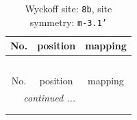 \documentclass[fleqn,8pt]{jsarticle}
\begin{document}
\renewcommand{\arraystretch}{1.2}
\begin{longtable}{ccc}
\caption{Wyckoff site: {\tt 8b}, site symmetry: {\tt m-3.1'}}
 \\
 \hline \hline
No. & position & mapping \\ \hline \endfirsthead

\multicolumn{2}{l}{\tablename\ \thetable{}} \\
 \hline \hline
No. & position & mapping \\ \hline \endhead

 \hline \hline
\multicolumn{2}{r}{\footnotesize\it continued ...} \\ \endfoot

 \hline \hline
\multicolumn{2}{r}{} \\ \endlastfoot


\end{longtable}
\end{document}
